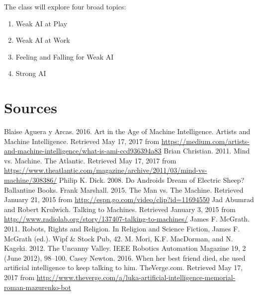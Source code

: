 \documentclass[nobib]{tufte-handout}
\begin{document}
The class will explore four broad topics:
\begin{enumerate}
\item Weak AI at Play
\item Weak AI at Work
\item Feeling and Falling for Weak AI
\item Strong AI
\end{enumerate}

\section{Sources}

\noindent
[1]Blaise Aguera y Arcas. 2016. Art in the Age of Machine Intelligence. Artists and Machine Intelligence. Retrieved May 17, 2017 from \url{https://medium.com/artists-and-machine-intelligence/what-is-ami-ccd936394a83}
\newline \vspace{.15in}
\noindent
[2]Brian Christian. 2011. Mind vs. Machine. The Atlantic. Retrieved May 17, 2017 from \url{https://www.theatlantic.com/magazine/archive/2011/03/mind-vs-machine/308386/}
\newline \vspace{.15in}
\noindent
[3]Philip K. Dick. 2008. Do Androids Dream of Electric Sheep? Ballantine Books.
\newline \vspace{.15in}
\noindent
[4]Frank Marshall. 2015. The Man vs. The Machine. Retrieved January 21, 2015 from \url{http://espn.go.com/video/clip?id=11694550}
\newline \vspace{.15in}
\noindent
[5]Jad Abumrad and Robert Krulwich. Talking to Machines. Retrieved January 3, 2015 from \url{http://www.radiolab.org/story/137407-talking-to-machines/}
\newline \vspace{.15in}
\noindent
[6]James F. McGrath. 2011. Robots, Rights and Religion. In Religion and Science Fiction, James F. McGrath (ed.). Wipf \& Stock Pub, 42.
\newline \vspace{.15in}
\noindent
[7]M. Mori, K.F. MacDorman, and N. Kageki. 2012. The Uncanny Valley. IEEE Robotics Automation Magazine 19, 2 (June 2012), 98--100.
\newline \vspace{.15in}
\noindent
[8]Casey Newton. 2016. When her best friend died, she used artificial intelligence to keep talking to him. TheVerge.com. Retrieved May 17, 2017 from \url{http://www.theverge.com/a/luka-artificial-intelligence-memorial-roman-mazurenko-bot}
\end{document}
